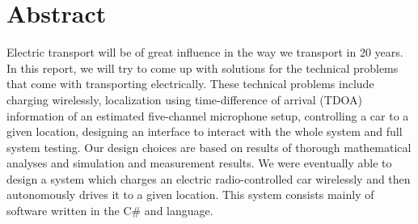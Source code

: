 \documentclass[11pt,titlepage]{report}
\begin{document}
\section*{Abstract}
Electric transport will be of great influence in the way we transport in 20 years. In this report, we will try to come up with solutions for the technical problems that come with transporting electrically. These technical problems include charging wirelessly, localization using time-difference of arrival (TDOA) information of an estimated five-channel microphone setup, controlling a car to a given location, designing an interface to interact with the whole system and full system testing. Our design choices are based on results of thorough mathematical analyses and simulation and measurement results. We were eventually able to design a system which charges an electric radio-controlled car wirelessly and then autonomously drives it to a given location. This system consists mainly of software written in the C\# and  language.
\end{document}
